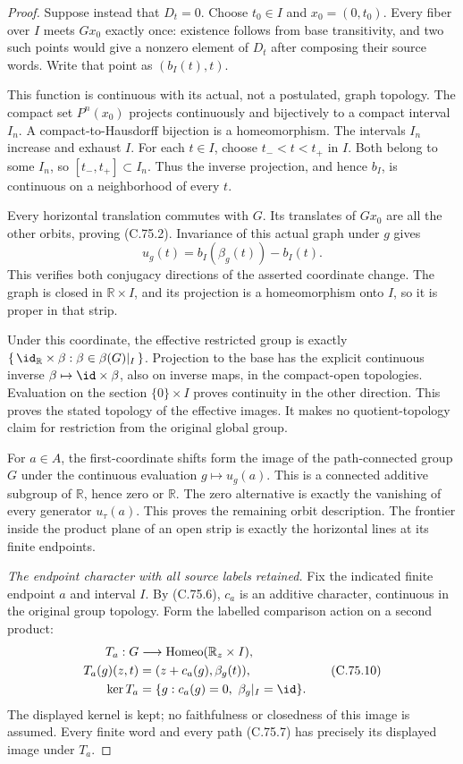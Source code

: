 \begin{proof}
Suppose instead that $D_t=0$.
Choose $t_0\in I$ and $x_0=(0,t_0)$.
Every fiber over $I$ meets $Gx_0$
exactly once: existence follows
from base transitivity, and two
such points would give a nonzero
element of $D_t$ after composing
their source words.
Write that point as $(b_I(t),t)$.

This function is continuous with
its actual, not a postulated,
graph topology. The compact set
$P^n(x_0)$ projects continuously
and bijectively to a compact
interval $I_n$. A compact-to-Hausdorff
bijection is a homeomorphism.
The intervals $I_n$ increase and
exhaust $I$. For each $t\in I$,
choose $t_-<t<t_+$ in $I$.
Both belong to some $I_n$, so
$[t_-,t_+]\subset I_n$.
Thus the inverse projection,
and hence $b_I$, is continuous
on a neighborhood of every $t$.

Every horizontal translation
commutes with $G$. Its translates
of $Gx_0$ are all the other
orbits, proving (C.75.2).
Invariance of this actual graph
under $g$ gives
\[
           u_g(t)=b_I(\beta_g(t))-b_I(t).
                                                               \tag{C.75.9}
\]
This verifies both conjugacy
directions of the asserted
coordinate change.
The graph is closed in
$\mathbb R\times I$, and its
projection is a homeomorphism
onto $I$, so it is proper
in that strip.

Under this coordinate, the
effective restricted group
is exactly $\{\,\id_{\mathbb R}
\times\beta:\beta\in\beta(G)|_I\,\}$.
Projection to the base has
the explicit continuous inverse
$\beta\mapsto\id\times\beta$,
also on inverse maps, in the
compact-open topologies.
Evaluation on the section
$\{0\}\times I$ proves
continuity in the other direction.
This proves the stated topology
of the effective images. It
makes no quotient-topology
claim for restriction from
the original global group.

For $a\in A$, the first-coordinate
shifts form the image of the
path-connected group $G$ under
the continuous evaluation
$g\mapsto u_g(a)$.
This is a connected additive
subgroup of $\mathbb R$, hence
zero or $\mathbb R$.
The zero alternative is exactly
the vanishing of every generator
$u_\tau(a)$. This proves the
remaining orbit description.
The frontier inside the product
plane of an open strip is
exactly the horizontal lines
at its finite endpoints.

\emph{The endpoint character with all source labels retained.}
Fix the indicated finite
endpoint $a$ and interval $I$.
By (C.75.6), $c_a$ is an
additive character, continuous
in the original group topology.
Form the labelled comparison
action on a second product:
\[
 \begin{split}
 T_a:G&\longrightarrow
                 \operatorname{Homeo}(\mathbb R_z\times I),\\
 T_a(g)(z,t)&=(z+c_a(g),\beta_g(t)),\\
 \ker T_a&=\{g:c_a(g)=0,\ \beta_g|_I=\id\}.
 \end{split}                                                   \tag{C.75.10}
\]
The displayed kernel is kept;
no faithfulness or closedness
of this image is assumed.
Every finite word and every
path (C.75.7) has precisely
its displayed image under $T_a$.


\end{proof}
